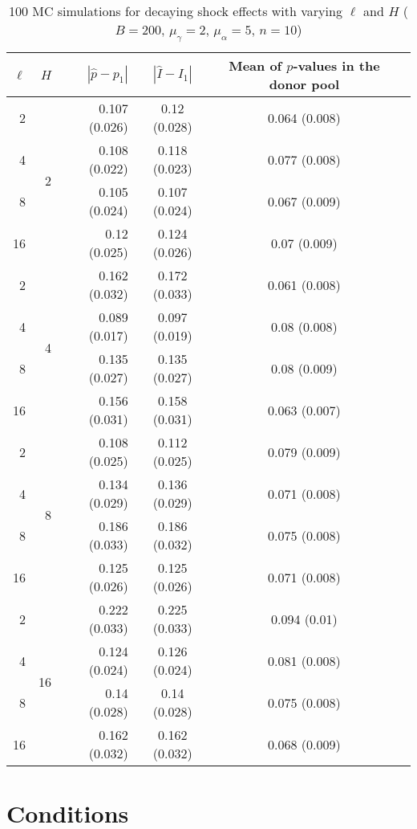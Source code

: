 \documentclass[12pt]{article}
\theoremstyle{definition}
\theoremstyle{definition}
\begin{document}
\begin{table}[H]
\caption{100 MC simulations for decaying shock effects with varying $\ell$ and $H$  ($B = 200$, $\mu_{\gamma}=2$, $\mu_{\alpha}=5$, $n=10$)} 
\begin{center}
\begin{tabular}{rrrccc}
  \hline
  $\ell$ & $H$ &  $|\hat{p}-p_1|$ & $|\hat{I}- I_1|$ & Mean of $p$-values in the donor pool  \\ 
  \hline
 2  &  \multirow{4}{*}{2}  & 0.107 (0.026) & 0.12 (0.028) & 0.064 (0.008) \\ 
   4  &  & 0.108 (0.022) & 0.118 (0.023) & 0.077 (0.008) \\ 
   8  &   & 0.105 (0.024) & 0.107 (0.024) & 0.067 (0.009) \\ 
   16  &   & 0.12 (0.025) & 0.124 (0.026) & 0.07 (0.009) \\[.15cm] 
    \hline  
   2  & \multirow{4}{*}{4}  & 0.162 (0.032) & 0.172 (0.033) & 0.061 (0.008) \\ 
   4  &  & 0.089 (0.017) & 0.097 (0.019) & 0.08 (0.008) \\ 
   8  &   & 0.135 (0.027) & 0.135 (0.027) & 0.08 (0.009) \\
   16  &   & 0.156 (0.031) & 0.158 (0.031) & 0.063 (0.007) \\[.15cm]  
   \hline  
   2  & \multirow{4}{*}{8}  & 0.108 (0.025) & 0.112 (0.025) & 0.079 (0.009) \\ 
   4  &   & 0.134 (0.029) & 0.136 (0.029) & 0.071 (0.008) \\ 
   8  &   & 0.186 (0.033) & 0.186 (0.032) & 0.075 (0.008) \\ 
   16  &   & 0.125 (0.026) & 0.125 (0.026) & 0.071 (0.008) \\[.15cm] 
    \hline  
   2  & \multirow{4}{*}{16}  & 0.222 (0.033) & 0.225 (0.033) & 0.094 (0.01) \\ 
   4  &   & 0.124 (0.024) & 0.126 (0.024) & 0.081 (0.008) \\ 
   8  &   & 0.14 (0.028) & 0.14 (0.028) & 0.075 (0.008) \\ 
   16  &   & 0.162 (0.032) & 0.162 (0.032) & 0.068 (0.009) \\ 
   \hline
\end{tabular}
\end{center}
\end{table}

\newpage


\section{Conditions}
\end{document}

